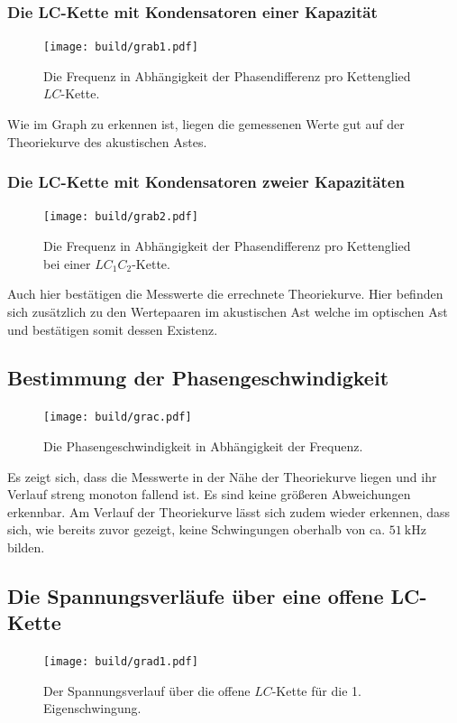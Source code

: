 \subsubsection{Die LC-Kette mit Kondensatoren einer Kapazität}
\begin{figure}[H]
	\centering
	\caption{Die Frequenz in Abhängigkeit der Phasendifferenz pro Kettenglied $LC$-Kette.}
	\texttt{[image: build/grab1.pdf]}
	\label{fig:grab1}
\end{figure}

Wie im Graph zu erkennen ist, liegen die gemessenen Werte gut auf der Theoriekurve des akustischen Astes.

\subsubsection{Die LC-Kette mit Kondensatoren zweier Kapazitäten}
\begin{figure}[H]
	\centering
	\caption{Die Frequenz in Abhängigkeit der Phasendifferenz pro Kettenglied bei einer $LC_1C_2$-Kette.}
	\texttt{[image: build/grab2.pdf]}
	\label{fig:grab2}
\end{figure}

Auch hier bestätigen die Messwerte die errechnete Theoriekurve. Hier befinden sich zusätzlich zu den Wertepaaren im akustischen Ast welche im optischen Ast und bestätigen somit dessen Existenz. 


\subsection{Bestimmung der Phasengeschwindigkeit}

\begin{figure}[H]
	\centering
	\caption{Die Phasengeschwindigkeit in Abhängigkeit der Frequenz.}
	\texttt{[image: build/grac.pdf]}
	\label{fig:grac}
\end{figure}

Es zeigt sich, dass die Messwerte in der Nähe der Theoriekurve liegen und ihr Verlauf
 streng monoton fallend ist. Es sind keine größeren Abweichungen erkennbar. Am
  Verlauf der Theoriekurve lässt sich zudem wieder erkennen, dass sich, wie bereits zuvor
 gezeigt, keine Schwingungen oberhalb von ca. $\SI{51}{\kilo\hertz}$ bilden.

\subsection{Die Spannungsverläufe über eine offene LC-Kette}

\begin{figure}[H]
	\centering
	\caption{Der Spannungsverlauf über die offene $LC$-Kette für die 1. Eigenschwingung.}
	\texttt{[image: build/grad1.pdf]}
	\label{fig:grad1}
\end{figure}

